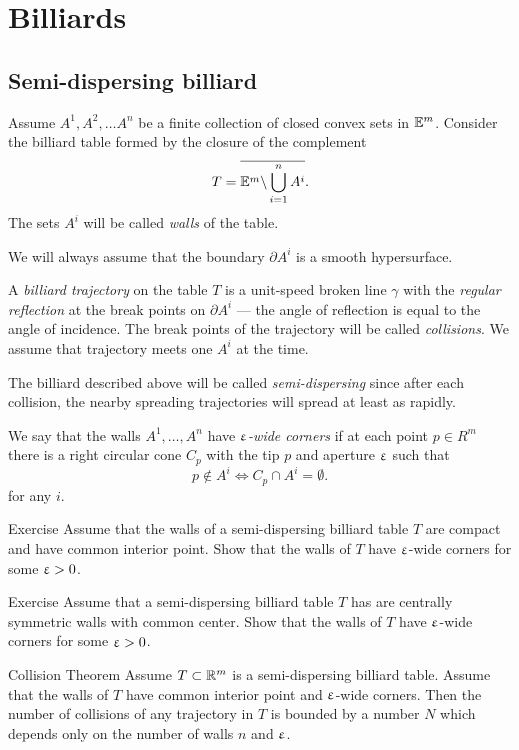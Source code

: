 \chapter{Billiards}
\section{Semi-dispersing billiard}

Assume $A^1,A^2,\dots A^n$ be a finite collection of closed convex sets in $\mathbb{E}^m$.
Consider the billiard table formed by the closure of the complement 
$$T=\overline{\mathbb{E}^m\backslash \bigcup_{i=1}^n A^i}.$$
The sets $A^i$ will be called \emph{walls} of the table.

We will always assume that the boundary $\partial A^i$ is a smooth hypersurface.

A \emph{billiard trajectory} 
on the table $T$ is a unit-speed broken line $\gamma$
with the \emph{regular reflection} at the break points on $\partial A^i$ 
--- the angle of reflection is equal to the angle of incidence.
The break points of the trajectory will be called \emph{collisions}.
We assume that trajectory meets one $A^i$ at the time.

The billiard described above will be called \emph{semi-dispersing} since after each collision, the nearby spreading trajectories will spread at least as rapidly.

We say that the walls $A^1,\dots,A^n$ have \emph{$\upvarepsilon$-wide corners} 
if at each point $p\in R^m$ 
there is a right circular cone $C_p$ with the tip $p$ and aperture $\upvarepsilon$
such that 
\[p\notin A^i\iff C_p\cap A^i=\emptyset.\]
for any $i$. 

\begin{thm}{Exercise}
Assume that the walls
of a semi-dispersing billiard table $T$ 
are compact and have common interior point.
Show that the walls of $T$ have $\upvarepsilon$-wide corners
for some $\upvarepsilon>0$.
\end{thm}

\begin{thm}{Exercise}\label{ex:centrally-simmetric-walls}
Assume that a semi-dispersing billiard table $T$ has
are centrally symmetric walls with common center.
Show that the walls of $T$  have $\upvarepsilon$-wide corners
for some $\upvarepsilon>0$.
\end{thm}

\begin{thm}{Collision Theorem}\label{thm:collision}
Assume $T\subset\RR^m$
is a semi-dispersing billiard table.
Assume that the walls of $T$ have common interior point and $\upvarepsilon$-wide corners.
Then the number of collisions of any trajectory in  $T$  is bounded
by a number $N$ which depends only on the number of walls $n$ and $\upvarepsilon$.
\end{thm}


